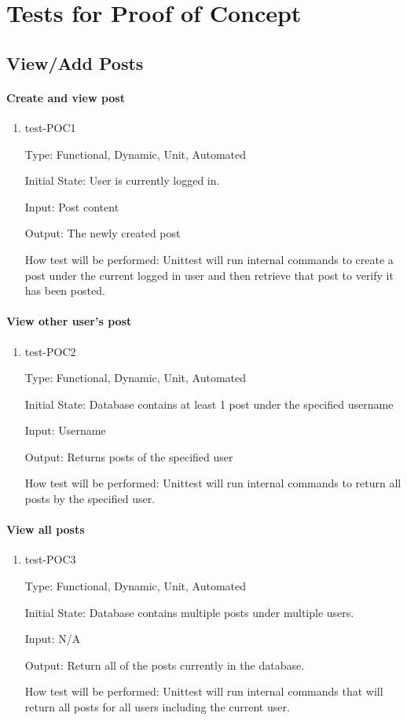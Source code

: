 \documentclass[12pt, titlepage]{article}
\begin{document}
\newpage
\section{Tests for Proof of Concept}

\subsection{View/Add Posts}

\paragraph{Create and view post}
\begin{enumerate}
\item{test-POC1}

Type: Functional, Dynamic, Unit, Automated
					
Initial State: User is currently logged in.
					
Input: Post content
					
Output: The newly created post
					
How test will be performed: Unittest will run internal commands to create a post under the current logged in user and then retrieve that post to verify it has been posted.
\end{enumerate}

\paragraph{View other user's post}
\begin{enumerate}
\item{test-POC2}

Type: Functional, Dynamic, Unit, Automated

Initial State: Database contains at least 1 post under the specified username 
					
Input: Username
					
Output: Returns posts of the specified user
					
How test will be performed: Unittest will run internal commands to return all posts by the specified user.
\end{enumerate}

\paragraph{View all posts}
\begin{enumerate}
\item{test-POC3}

Type: Functional, Dynamic, Unit, Automated

Initial State: Database contains multiple posts under multiple users.
					
Input: N/A
					
Output: Return all of the posts currently in the database.
					
How test will be performed: Unittest will run internal commands that will return all posts for all users including the current user.
\end{enumerate}
\end{document}
